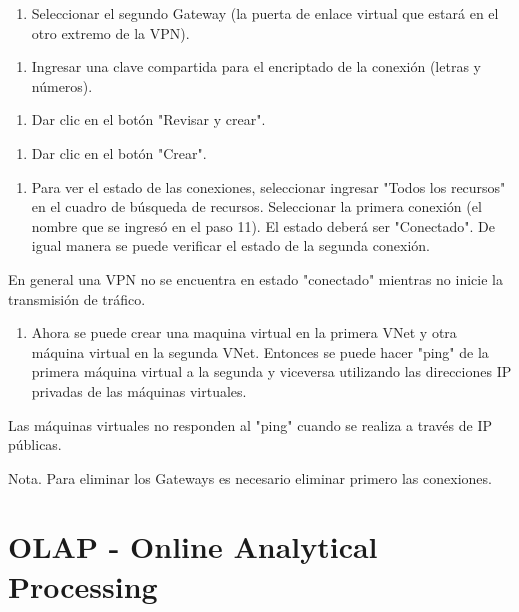 \begin{enumerate}
\item Seleccionar el segundo Gateway (la puerta de enlace virtual que estará en el otro extremo de la VPN).
\end{enumerate}

\begin{enumerate}
\item Ingresar una clave compartida para el encriptado de la conexión (letras y números).
\end{enumerate}

\begin{enumerate}
\item Dar clic en el botón "Revisar y crear".
\end{enumerate}

\begin{enumerate}
\item Dar clic en el botón "Crear".
\end{enumerate}

\begin{enumerate}
\item Para ver el estado de las conexiones, seleccionar ingresar "Todos los recursos" en el cuadro de búsqueda de recursos. Seleccionar la primera conexión (el nombre que se ingresó en el paso 11). El estado deberá ser "Conectado". De igual manera se puede verificar el estado de la segunda conexión.
\end{enumerate}

En general una VPN no se encuentra en estado "conectado" mientras no inicie la transmisión de tráfico.

\begin{enumerate}
\item Ahora se puede crear una maquina virtual en la primera VNet y otra máquina virtual en la segunda VNet. Entonces se puede hacer "ping" de la primera máquina virtual a la segunda y viceversa utilizando las direcciones IP privadas de las máquinas virtuales.
\end{enumerate}

Las máquinas virtuales no responden al "ping" cuando se realiza a través de IP públicas.

Nota. Para eliminar los Gateways es necesario eliminar primero las conexiones.

\clearpage


\chapter{OLAP - Online Analytical Processing}


